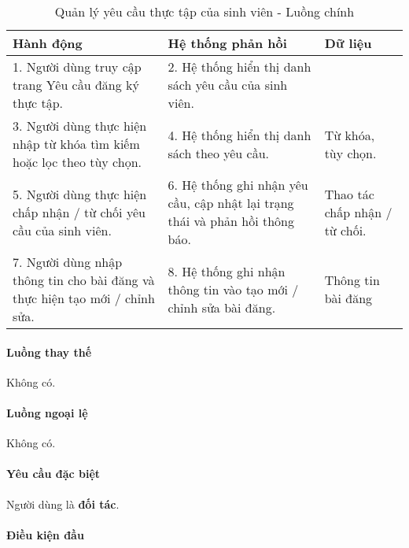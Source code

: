 \documentclass[./../main.tex]{subfiles}
\begin{document}
\begin{table}[H]
	\caption{Quản lý yêu cầu thực tập của sinh viên - Luồng chính}
	\label{tab:partner_manage_requests}
	\begin{tabularx}{\textwidth}{|X|X|X|}
		\hline
		\textbf{Hành động}                                                          & \textbf{Hệ thống phản hồi}                                                   & \textbf{Dữ liệu}              \\ \hline
		1. Người dùng truy cập trang Yêu cầu đăng ký thực tập.                      & 2. Hệ thống hiển thị danh sách yêu cầu của sinh viên.                        &                               \\ \hline
		3. Người dùng thực hiện nhập từ khóa tìm kiếm hoặc lọc theo tùy chọn.       & 4. Hệ thống hiển thị danh sách theo yêu cầu.                                 & Từ khóa, tùy chọn.            \\ \hline
		5. Người dùng thực hiện chấp nhận / từ chối yêu cầu của sinh viên.          & 6. Hệ thống ghi nhận yêu cầu, cập nhật lại trạng thái và phản hồi thông báo. & Thao tác chấp nhận / từ chối. \\ \hline
		7. Người dùng nhập thông tin cho bài đăng và thực hiện tạo mới / chỉnh sửa. & 8. Hệ thống ghi nhận thông tin vào tạo mới / chỉnh sửa bài đăng.             & Thông tin bài đăng            \\ \hline
	\end{tabularx}
\end{table}

\paragraph*{Luồng thay thế} Không có.

\paragraph*{Luồng ngoại lệ} Không có.

\paragraph*{Yêu cầu đặc biệt}

Người dùng là \textbf{đối tác}.

\paragraph*{Điều kiện đầu}
\end{document}
